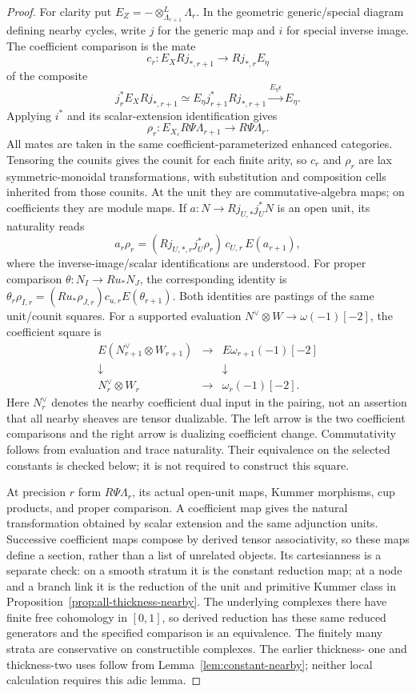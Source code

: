 \documentclass[11pt]{article}
\theoremstyle{definition}
\theoremstyle{remark}
\begin{document}
\begin{proof}
For clarity put $E_Z=-\otimes^L_{\Lambda_{r+1}}\Lambda_r$.
In the geometric generic/special diagram defining nearby cycles,
write $j$ for the generic map and $i$ for special inverse image.
The coefficient comparison is the mate
\[
 c_r:E_XRj_{*,r+1}\longrightarrow Rj_{*,r}E_\eta
\]
of the composite
\[
 j_r^*E_XRj_{*,r+1}\simeq E_\eta j_{r+1}^*Rj_{*,r+1}
       \xrightarrow{E_\eta\epsilon}E_\eta.
\]
Applying $i^*$ and its scalar-extension identification gives
\[
 \rho_r:E_{X_s}R\Psi\Lambda_{r+1}\longrightarrow R\Psi\Lambda_r.
\]
All mates are taken in the same coefficient-parameterized enhanced
categories.  Tensoring the counits gives the counit for each finite
arity, so $c_r$ and $\rho_r$ are lax symmetric-monoidal transformations,
with substitution and composition cells inherited from those counits.
At the unit they are commutative-algebra maps; on coefficients they
are module maps.  If $a:N\to Rj_{U,*}j_U^*N$ is an open unit, its
naturality reads
\[
 a_r\rho_r=(Rj_{U,*,r}j_U^*\rho_r)\,c_{U,r}\,E(a_{r+1}),
\]
where the inverse-image/scalar identifications are understood.
For proper comparison $\theta:N_I\to Ru_*N_J$, the corresponding
identity is
$\theta_r\rho_{I,r}=(Ru_*\rho_{J,r})c_{u,r}E(\theta_{r+1})$.
Both identities are pastings of the same unit/counit squares.
For a supported evaluation $N^\vee\otimes W\to\omega(-1)[-2]$,
the coefficient square is
\[
\begin{array}{ccc}
 E(N^\vee_{r+1}\otimes W_{r+1})&\longrightarrow&E\omega_{r+1}(-1)[-2]\\
 \downarrow&&\downarrow\\
 N^\vee_r\otimes W_r&\longrightarrow&\omega_r(-1)[-2].
\end{array}
\]
Here $N^\vee_r$ denotes the nearby coefficient dual input in the
pairing, not an assertion that all nearby sheaves are tensor dualizable.
The left arrow is the two coefficient comparisons and the right arrow
is dualizing coefficient change.  Commutativity follows from evaluation
and trace naturality.  Their equivalence on the selected constants is
checked below; it is not required to construct this square.

At precision $r$ form $R\Psi\Lambda_r$, its actual open-unit maps,
Kummer morphisms, cup products, and proper comparison.  A coefficient
map gives the natural transformation obtained by scalar extension and
the same adjunction units.  Successive coefficient maps compose by
derived tensor associativity, so these maps define a section, rather
than a list of unrelated objects.  Its cartesianness is a separate
check: on a smooth stratum it is the constant reduction map; at a
node and a branch link it is the reduction of the unit and primitive
Kummer class in Proposition~\ref{prop:all-thickness-nearby}.  The
underlying complexes there have finite free cohomology in $[0,1]$,
so derived reduction has these same reduced generators and the
specified comparison is an equivalence.  The finitely many strata
are conservative on constructible complexes.  The earlier thickness-
one and thickness-two uses follow from Lemma~\ref{lem:constant-nearby};
neither local calculation requires this adic lemma.


\end{proof}
\end{document}
